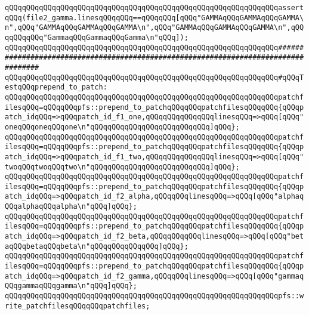 \verb|qQQqqQQqqQQqqQQqqQQqqQQqqQQqqQQqqQQqqQQqqQQqqQQqqQQqqQQqqQQqqQQqassertqQQq(file2_gamma.linesqQQqqQQq==qQQqqQQq[qQQq"GAMMAqQQqGAMMAqQQqGAMMA\n",qQQq"GAMMAqQQqGAMMAqQQqGAMMA\n",qQQq"GAMMAqQQqGAMMAqQQqGAMMA\n",qQQqqQQqqQQq"GammaqQQqGammaqQQqGamma\n"qQQq]);|\newline
\newline
\newline
\newline
\verb|qQQqqQQqqQQqqQQqqQQqqQQqqQQqqQQqqQQqqQQqqQQqqQQqqQQqqQQqqQQqqQQq####################################################################################|\newline
\verb|qQQqqQQqqQQqqQQqqQQqqQQqqQQqqQQqqQQqqQQqqQQqqQQqqQQqqQQqqQQqqQQq#qQQqTestqQQqprepend_to_patch:|\newline
\newline
\verb|qQQqqQQqqQQqqQQqqQQqqQQqqQQqqQQqqQQqqQQqqQQqqQQqqQQqqQQqqQQqqQQqpatchfilesqQQq=qQQqqQQqpfs::prepend_to_patchqQQqqQQqpatchfilesqQQqqQQq{qQQqpatch_idqQQq=>qQQqpatch_id_f1_one,qQQqqQQqqQQqqQQqlinesqQQq=>qQQq[qQQq"oneqQQqoneqQQqone\n"qQQqqQQqqQQqqQQqqQQqqQQqqQQq]qQQq};|\newline
\verb|qQQqqQQqqQQqqQQqqQQqqQQqqQQqqQQqqQQqqQQqqQQqqQQqqQQqqQQqqQQqqQQqpatchfilesqQQq=qQQqqQQqpfs::prepend_to_patchqQQqqQQqpatchfilesqQQqqQQq{qQQqpatch_idqQQq=>qQQqpatch_id_f1_two,qQQqqQQqqQQqqQQqlinesqQQq=>qQQq[qQQq"twoqQQqtwoqQQqtwo\n"qQQqqQQqqQQqqQQqqQQqqQQqqQQq]qQQq};|\newline
\newline
\verb|qQQqqQQqqQQqqQQqqQQqqQQqqQQqqQQqqQQqqQQqqQQqqQQqqQQqqQQqqQQqqQQqpatchfilesqQQq=qQQqqQQqpfs::prepend_to_patchqQQqqQQqpatchfilesqQQqqQQq{qQQqpatch_idqQQq=>qQQqpatch_id_f2_alpha,qQQqqQQqlinesqQQq=>qQQq[qQQq"alphaqQQqalphaqQQqalpha\n"qQQq]qQQq};|\newline
\verb|qQQqqQQqqQQqqQQqqQQqqQQqqQQqqQQqqQQqqQQqqQQqqQQqqQQqqQQqqQQqqQQqpatchfilesqQQq=qQQqqQQqpfs::prepend_to_patchqQQqqQQqpatchfilesqQQqqQQq{qQQqpatch_idqQQq=>qQQqpatch_id_f2_beta,qQQqqQQqqQQqlinesqQQq=>qQQq[qQQq"betaqQQqbetaqQQqbeta\n"qQQqqQQqqQQqqQQq]qQQq};|\newline
\verb|qQQqqQQqqQQqqQQqqQQqqQQqqQQqqQQqqQQqqQQqqQQqqQQqqQQqqQQqqQQqqQQqpatchfilesqQQq=qQQqqQQqpfs::prepend_to_patchqQQqqQQqpatchfilesqQQqqQQq{qQQqpatch_idqQQq=>qQQqpatch_id_f2_gamma,qQQqqQQqlinesqQQq=>qQQq[qQQq"gammaqQQqgammaqQQqgamma\n"qQQq]qQQq};|\newline
\newline
\verb|qQQqqQQqqQQqqQQqqQQqqQQqqQQqqQQqqQQqqQQqqQQqqQQqqQQqqQQqqQQqqQQqpfs::write_patchfilesqQQqqQQqpatchfiles;|\newline
